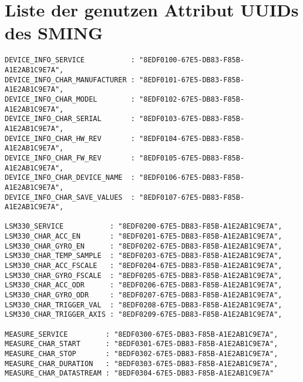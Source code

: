 \chapter{Liste der genutzen Attribut UUIDs des SMING}
\begin{lstlisting}
DEVICE_INFO_SERVICE           : "8EDF0100-67E5-DB83-F85B-A1E2AB1C9E7A",
DEVICE_INFO_CHAR_MANUFACTURER : "8EDF0101-67E5-DB83-F85B-A1E2AB1C9E7A",
DEVICE_INFO_CHAR_MODEL        : "8EDF0102-67E5-DB83-F85B-A1E2AB1C9E7A",
DEVICE_INFO_CHAR_SERIAL       : "8EDF0103-67E5-DB83-F85B-A1E2AB1C9E7A",
DEVICE_INFO_CHAR_HW_REV       : "8EDF0104-67E5-DB83-F85B-A1E2AB1C9E7A",
DEVICE_INFO_CHAR_FW_REV       : "8EDF0105-67E5-DB83-F85B-A1E2AB1C9E7A",
DEVICE_INFO_CHAR_DEVICE_NAME  : "8EDF0106-67E5-DB83-F85B-A1E2AB1C9E7A",
DEVICE_INFO_CHAR_SAVE_VALUES  : "8EDF0107-67E5-DB83-F85B-A1E2AB1C9E7A",

LSM330_SERVICE           : "8EDF0200-67E5-DB83-F85B-A1E2AB1C9E7A",
LSM330_CHAR_ACC_EN       : "8EDF0201-67E5-DB83-F85B-A1E2AB1C9E7A",
LSM330_CHAR_GYRO_EN      : "8EDF0202-67E5-DB83-F85B-A1E2AB1C9E7A",
LSM330_CHAR_TEMP_SAMPLE  : "8EDF0203-67E5-DB83-F85B-A1E2AB1C9E7A",
LSM330_CHAR_ACC_FSCALE   : "8EDF0204-67E5-DB83-F85B-A1E2AB1C9E7A",
LSM330_CHAR_GYRO_FSCALE  : "8EDF0205-67E5-DB83-F85B-A1E2AB1C9E7A",
LSM330_CHAR_ACC_ODR      : "8EDF0206-67E5-DB83-F85B-A1E2AB1C9E7A",
LSM330_CHAR_GYRO_ODR     : "8EDF0207-67E5-DB83-F85B-A1E2AB1C9E7A",
LSM330_CHAR_TRIGGER_VAL  : "8EDF0208-67E5-DB83-F85B-A1E2AB1C9E7A",
LSM330_CHAR_TRIGGER_AXIS : "8EDF0209-67E5-DB83-F85B-A1E2AB1C9E7A",

MEASURE_SERVICE         : "8EDF0300-67E5-DB83-F85B-A1E2AB1C9E7A",
MEASURE_CHAR_START      : "8EDF0301-67E5-DB83-F85B-A1E2AB1C9E7A",
MEASURE_CHAR_STOP       : "8EDF0302-67E5-DB83-F85B-A1E2AB1C9E7A",
MEASURE_CHAR_DURATION   : "8EDF0303-67E5-DB83-F85B-A1E2AB1C9E7A",
MEASURE_CHAR_DATASTREAM : "8EDF0304-67E5-DB83-F85B-A1E2AB1C9E7A"
\end{lstlisting}